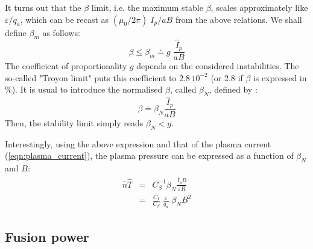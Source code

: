 It turns out that the $\beta$ limit, i.e. the maximum stable $\beta$, scales approximately like $\varepsilon/q_a$, which can be recast as $(\mu_0/2\pi)\; I_p/aB$ from the above relations. We shall define $\beta_m$ as follows:
\begin{equation*}
  \beta \leqslant \beta_m \doteq g\; \frac{\hat I_p}{a B}
\end{equation*}
The coefficient of proportionality $g$ depends on the considered instabilities. The so-called "Troyon limit" \cite{Troyon1984} puts this coefficient to $2.8\, 10^{-2}$ (or 2.8 if $\beta$ is expressed in $\%$).
It is usual to introduce the normalised $\beta$, called $\beta_N$, defined by \cite[eq.(13.146)]{Freidberg2007}:
\begin{equation}
    \beta \doteq \beta_N \frac{\hat I_p}{a B}
\end{equation}
Then, the stability limit simply reads $\beta_N <g$.

Interestingly, using the above expression and that of the plasma current (\ref{eqn:plasma_current}), the plasma pressure can be expressed as a function of $\beta_N$ and $B$:
\begin{eqnarray}
  \hat n\hat T &=& C_\beta^{-1} \beta_N \frac{\hat I_p B}{\varepsilon R} \nonumber \\
    &=& \frac{C_I}{C_\beta}\; \frac{\varepsilon}{q_a} \;  \beta_N B^2
  \label{eqn:nT_betaN}
\end{eqnarray}

\subsection{Fusion power}

